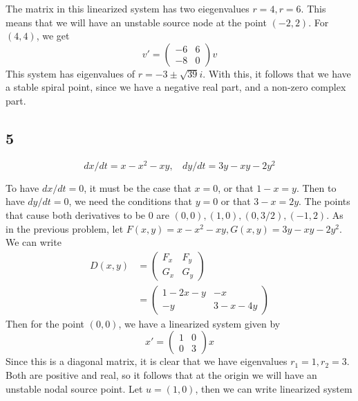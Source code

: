 \documentclass{article}
\theoremstyle{definition}
\begin{document}
        The matrix in this linearized system has two eiegenvalues $r=4, r = 6$. This means 
        that we will have an unstable source node at the point $(-2,2)$. For $(4,4)$, we get 
        \[
            v' = \begin{pmatrix}
                -6 & 6 \\
                -8 & 0
            \end{pmatrix}   v
        \]
        This system has eigenvalues of $r = -3 \pm \sqrt{39}i$. With this, it follows that we have 
        a stable spiral point, since we have a negative real part, and a non-zero complex part.
    \subsection*{5}
        \begin{mdframed}[]
            \[
                dx/dt = x-x^2-xy, \ \ \ \ dy/dt = 3y - xy - 2y^2
            \]
        \end{mdframed}
        To have $dx/dt=0$, it must be the case that $x = 0$, or that $1-x = y$. Then to have 
        $dy/dt = 0$, we need the conditions that $y = 0$ or that $3 - x = 2y$.
        The points that cause both derivatives to be 0 are $(0,0),(1,0),(0,3/2), (-1,2)$.
        As in the previous problem, let $F(x,y) = x - x^2 - xy, G(x,y) = 3y - xy -2y^2$. 
        We can write 
        \begin{align*}
            D(x,y) &= \begin{pmatrix}
                F_x & F_y \\
                G_x & G_y
            \end{pmatrix} \\
            &= \begin{pmatrix}
                1 - 2x - y & -x \\
                -y & 3 - x -4y
            \end{pmatrix} 
        \end{align*}
        Then for the point $(0,0)$, we have a linearized system given by 
        \[
            x' = \begin{pmatrix}
                1 & 0 \\
                0 & 3
            \end{pmatrix}x
        \]
        Since this is a diagonal matrix, it is clear that we have eigenvalues $r_1 = 1, r_2 = 3$.
        Both are positive and real, so it follows that at the origin we will have an 
        unstable nodal source point. Let $u = (1, 0)$, then we can write linearized system
\end{document}
